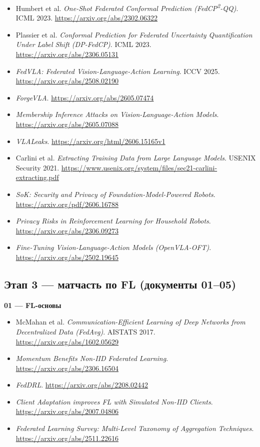 \documentclass[11pt]{article}
\begin{document}
\begin{itemize}[leftmargin=1.3cm]
  \item Humbert et al. \emph{One-Shot Federated Conformal Prediction (FedCP\textsuperscript{2}-QQ)}.
        ICML 2023. \url{https://arxiv.org/abs/2302.06322}
  \item Plassier et al. \emph{Conformal Prediction for Federated Uncertainty
        Quantification Under Label Shift (DP-FedCP)}. ICML 2023.
        \url{https://arxiv.org/abs/2306.05131}
  \item \emph{FedVLA: Federated Vision-Language-Action Learning}. ICCV 2025.
        \url{https://arxiv.org/abs/2508.02190}
  \item \emph{ForgeVLA}. \url{https://arxiv.org/abs/2605.07474}
  \item \emph{Membership Inference Attacks on Vision-Language-Action Models}.
        \url{https://arxiv.org/abs/2605.07088}
  \item \emph{VLALeaks}. \url{https://arxiv.org/html/2606.15165v1}
  \item Carlini et al. \emph{Extracting Training Data from Large Language
        Models}. USENIX Security 2021.
        \url{https://www.usenix.org/system/files/sec21-carlini-extracting.pdf}
  \item \emph{SoK: Security and Privacy of Foundation-Model-Powered Robots}.
        \url{https://arxiv.org/pdf/2606.16788}
  \item \emph{Privacy Risks in Reinforcement Learning for Household Robots}.
        \url{https://arxiv.org/abs/2306.09273}
  \item \emph{Fine-Tuning Vision-Language-Action Models (OpenVLA-OFT)}.
        \url{https://arxiv.org/abs/2502.19645}
\end{itemize}

\subsection*{Этап 3 --- матчасть по FL (документы 01--05)}

\textbf{01 --- FL-основы}
\begin{itemize}[leftmargin=1.3cm]
  \item McMahan et al. \emph{Communication-Efficient Learning of Deep Networks
        from Decentralized Data (FedAvg)}. AISTATS 2017.
        \url{https://arxiv.org/abs/1602.05629}
  \item \emph{Momentum Benefits Non-IID Federated Learning}.
        \url{https://arxiv.org/abs/2306.16504}
  \item \emph{FedDRL}. \url{https://arxiv.org/abs/2208.02442}
  \item \emph{Client Adaptation improves FL with Simulated Non-IID Clients}.
        \url{https://arxiv.org/abs/2007.04806}
  \item \emph{Federated Learning Survey: Multi-Level Taxonomy of Aggregation
        Techniques}. \url{https://arxiv.org/abs/2511.22616}
\end{itemize}
\end{document}
